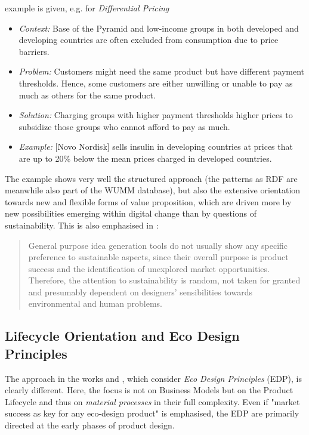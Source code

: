\documentclass[11pt,a4paper]{article}
\begin{document}
example is given, e.g. for \emph{Differential Pricing}
\begin{itemize}
\item \emph{Context:} Base of the Pyramid and low-income groups in both
  developed and developing countries are often excluded from consumption due
  to price barriers.
\item \emph{Problem:} Customers might need the same product but have different
  payment thresholds. Hence, some customers are either unwilling or unable to
  pay as much as others for the same product.
\item \emph{Solution:} Charging groups with higher payment thresholds higher
  prices to subsidize those groups who cannot afford to pay as much.
\item \emph{Example:} [Novo Nordisk] sells insulin in developing countries at
  prices that are up to 20\% below the mean prices charged in developed
  countries.
\end{itemize}

The example shows very well the structured approach (the patterns as RDF are
meanwhile also part of the WUMM database), but also the extensive orientation
towards new and flexible forms of value proposition, which are driven more by
new possibilities emerging within digital change than by questions of
sustainability.  This is also emphasised in \cite[p. 3]{Russo2020}:
\begin{quote}
  General purpose idea generation tools do not usually show any specific
  preference to sustainable aspects, since their overall purpose is product
  success and the identification of unexplored market opportunities.
  Therefore, the attention to sustainability is random, not taken for granted
  and presumably dependent on designers’ sensibilities towards environmental
  and human problems.
\end{quote}


\subsection{Lifecycle Orientation and Eco Design Principles}

The approach in the works \cite{Russo2020} and \cite{Maccioni2019}, which
consider \emph{Eco Design Principles} (EDP), is clearly different. Here, the
focus is not on Business Models but on the Product Lifecycle and thus on
\emph{material processes} in their full complexity. Even if "market success as
key for any eco-design product" \cite[p. 1]{Maccioni2019} is emphasised, the
EDP are primarily directed at the early phases of product design.
\end{document}
